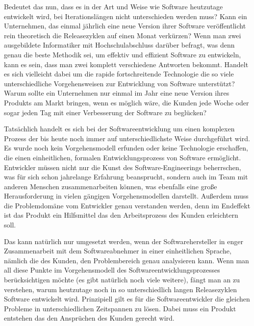 Bedeutet das nun, dass es in der Art und Weise wie Software heutzutage
entwickelt wird, bei Iterationslängen nicht unterschieden werden muss? Kann
ein Unternehmen, das einmal jährlich eine neue Version ihrer Software
veröffentlicht rein theoretisch die Releasezyklen auf einen Monat verkürzen?
Wenn man zwei ausgebildete Informatiker mit Hochschulabschluss darüber
befragt, was denn genau die beste Methodik sei, um effektiv und effizient
Software zu entwickeln, kann es sein, dass man zwei komplett verschiedene
Antworten bekommt. Handelt es sich vielleicht dabei um die rapide
fortschreitende Technologie die so viele unterschiedliche Vorgehensweisen zur
Entwicklung von Software unterstützt? Warum sollte ein Unternehmen nur einmal
im Jahr eine neue Version ihres Produkts am Markt bringen, wenn es möglich
wäre, die Kunden jede Woche oder sogar jeden Tag mit einer Verbesserung der
Software zu beglücken?

Tatsächlich handelt es sich bei der Softwareentwicklung um einen komplexen
Prozess der bis heute noch immer auf unterschiedlichste Weise durchgeführt
wird. Es wurde noch kein Vorgehensmodell erfunden oder keine Technologie
erschaffen, die einen einheitlichen, formalen Entwicklungsprozess von Software
ermöglicht. Entwickler müssen nicht nur die Kunst des Software-Engineerings
beherrschen, was für sich schon jahrelange Erfahrung beansprucht, sondern auch
im Team mit anderen Menschen zusammenarbeiten können, was ebenfalls eine große
Herausforderung in vielen gängigen Vorgehensmodellen darstellt. Außerdem muss
die Problemdomäne vom Entwickler genau verstanden werden, denn im Endeffekt
ist das Produkt ein Hilfsmittel das den Arbeitsprozess des Kunden erleichtern
soll.

Das kann natürlich nur umgesetzt werden, wenn der Softwarehersteller in enger
Zusammenarbeit mit dem Softwareabnehmer in einer einheitlichen Sprache,
nämlich die des Kunden, den Problembereich genau analysieren kann. Wenn man
all diese Punkte im Vorgehensmodell des Softwareentwicklungsprozesses
berücksichtigen möchte (es gibt natürlich noch viele weitere), fängt man an zu
verstehen, warum heutzutage noch in so unterschiedlich langen Releasezyklen
Software entwickelt wird. Prinzipiell gilt es für die Softwareentwickler die
gleichen Probleme in unterschiedlichen Zeitspannen zu lösen. Dabei muss ein
Produkt entstehen das den Ansprüchen des Kunden gerecht wird.

